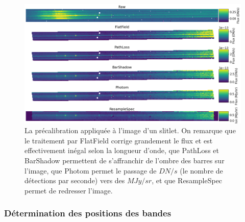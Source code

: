 \documentclass[11pt, a4paper]{article}
\begin{document}
\begin{figure}[H]
  \centering
  \includegraphics[scale=0.45]{assets/precal.png}
  \caption{La précalibration appliquée à l'image d'un slitlet. On remarque que le traitement par FlatField corrige grandement le flux et est effectivement inégal selon la longueur d'onde, que PathLoss et BarShadow permettent de s'affranchir de l'ombre des barres sur l'image, que Photom permet le passage de $DN/s$ (le nombre de détections par seconde) vers des $MJy/sr$, et que ResampleSpec permet de redresser l'image.}
  \label{fig:precal}
\end{figure}


\subsubsection{Détermination des positions des bandes}
\end{document}
